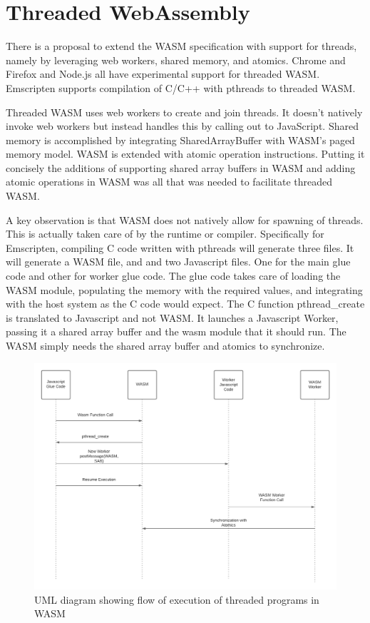 \documentclass[11pt]{book}
\begin{document}


\section{Threaded WebAssembly}
There is a proposal to extend the WASM specification with support for threads, namely by leveraging web workers, shared memory, and atomics. Chrome and Firefox and Node.js all have experimental support for threaded WASM. Emscripten supports compilation of C/C++ with pthreads to threaded WASM.

Threaded WASM uses web workers to create and join threads. It doesn't natively invoke web workers but instead handles this by calling out to JavaScript. Shared memory is accomplished by integrating SharedArrayBuffer with WASM's paged memory model. WASM is extended with atomic operation instructions. Putting it concisely the additions of supporting shared array buffers in WASM and adding atomic operations in WASM was all that was needed to facilitate threaded WASM.

A key observation is that WASM does not natively allow for spawning of threads. This is actually taken care of by the runtime or compiler. Specifically for Emscripten, compiling C code written with pthreads will generate three files. It will generate a WASM file, and and two Javascript files. One for the main glue code and other for worker glue code. The glue code takes care of loading the WASM module, populating the memory with the required values, and integrating with the host system as the C code would expect. The C function pthread\_create is translated to Javascript and not WASM. It launches a Javascript Worker, passing it a shared array buffer and the wasm module that it should run. The WASM simply needs the shared array buffer and atomics to synchronize.  

\begin{figure}[htb]
\centerline{\includegraphics[width=\textwidth]{figures/UML_threaded_wasm.png}}
\caption{UML diagram showing flow of execution of threaded programs in WASM}
\label{uml}
\end{figure}
\end{document}
